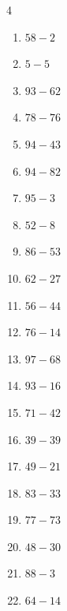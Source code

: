 \begin{multicols}{4}
\begin{enumerate}
  \item $58-2$
        \phantom{$=56$}

  \item $5-5$
        \phantom{$=0$}

  \item $93-62$
        \phantom{$=31$}

  \item $78-76$
        \phantom{$=2$}

  \item $94-43$
        \phantom{$=51$}

  \item $94-82$
        \phantom{$=12$}

  \item $95-3$
        \phantom{$=92$}

  \item $52-8$
        \phantom{$=44$}

  \item $86-53$
        \phantom{$=33$}

  \item $62-27$
        \phantom{$=35$}

  \item $56-44$
        \phantom{$=12$}

  \item $76-14$
        \phantom{$=62$}

  \item $97-68$
        \phantom{$=29$}

  \item $93-16$
        \phantom{$=77$}

  \item $71-42$
        \phantom{$=29$}

  \item $39-39$
        \phantom{$=0$}

\columnbreak %

  \item $49-21$
        \phantom{$=28$}

  \item $83-33$
        \phantom{$=50$}

  \item $77-73$
        \phantom{$=4$}

  \item $48-30$
        \phantom{$=18$}

  \item $88-3$
        \phantom{$=85$}

  \item $64-14$
        \phantom{$=50$}


\end{enumerate}
\end{multicols}
